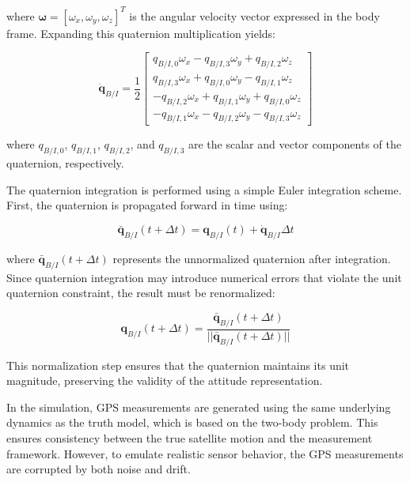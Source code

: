 \noindent where $\boldsymbol{\omega} = [\omega_x, \omega_y, \omega_z]^T$ is the angular velocity vector expressed in the body frame. 
Expanding this quaternion multiplication yields:

\begin{equation}
\dot{\mathbf{q}}_{B/I} = \frac{1}{2}
\begin{bmatrix}
q_{B/I,0} \omega_x - q_{B/I,3} \omega_y + q_{B/I,2} \omega_z \\
q_{B/I,3} \omega_x + q_{B/I,0} \omega_y - q_{B/I,1} \omega_z \\
-q_{B/I,2} \omega_x + q_{B/I,1} \omega_y + q_{B/I,0} \omega_z \\
-q_{B/I,1} \omega_x - q_{B/I,2} \omega_y - q_{B/I,3} \omega_z
\end{bmatrix}
\end{equation}

\noindent where $q_{B/I,0}$, $q_{B/I,1}$, $q_{B/I,2}$, and $q_{B/I,3}$ are the scalar and vector components of the quaternion, respectively.

The quaternion integration is performed using a simple Euler integration scheme. First, the quaternion is propagated forward in time using:

\begin{equation}
\bar{\mathbf{q}}_{B/I}(t + \Delta t) = \mathbf{q}_{B/I}(t) + \dot{\mathbf{q}}_{B/I}\Delta t
\end{equation}

\noindent where $\bar{\mathbf{q}}_{B/I}(t + \Delta t)$ represents the unnormalized quaternion after integration. Since quaternion integration
 may introduce numerical errors that violate the unit quaternion constraint, the result must be renormalized:

\begin{equation}
\mathbf{q}_{B/I}(t + \Delta t) = \frac{\bar{\mathbf{q}}_{B/I}(t + \Delta t)}{||\bar{\mathbf{q}}_{B/I}(t + \Delta t)||}
\end{equation}

\noindent This normalization step ensures that the quaternion maintains its unit magnitude, preserving the validity of the attitude representation.




In the simulation, GPS measurements are generated using the same underlying dynamics as the truth model, which is based on the two-body problem. This ensures consistency between the true satellite motion and the measurement framework. However, to emulate realistic sensor behavior, the GPS measurements are corrupted by both noise and drift.

